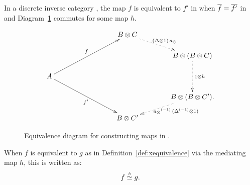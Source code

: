 \begin{definition}\label{def:xequivalence}
  In a discrete inverse category \X, the map $f$ is equivalent to $f'$ in \X when
  $\overline{f} = \overline{f'}$ in \X and Diagram~\ref{fig:xt_map_equivalence_diagram} commutes for some
  map $h$.
\begin{figure}[H]
  \[
    \xymatrix @C=40pt @R=15pt{
      & & B \* C \ar@{.>}[dr]^{(\Delta\* 1) \, a_{\*}}\\
      && & B \* (B\* C) \ar@{.>}[dd]^{1\* h} \\
      A \ar[uurr]^f \ar[ddrr]_{f'}&&&\\
      && & B \* (B \* C'). \ar@{.>}[dl]^(.4){\ \inv{a_{\*}}\,(\inv{\Delta}\* 1)}\\
      && B\* C'
    }
  \]
\caption{Equivalence diagram for constructing maps in \Xt.}
\label{fig:xt_map_equivalence_diagram}
\end{figure}
\end{definition}

\begin{notation}\label{notn:xequivalence}
  When $f$ is equivalent to $g$ as in Definition~\ref{def:xequivalence} via the mediating map $h$,
  this is written as:
  \[
    f\overset{\scriptscriptstyle h}{\simeq}g.
  \]
\end{notation}

